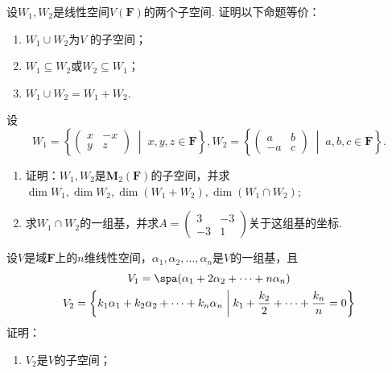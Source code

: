 \begin{exercise}
\begin{exgroup}
        \item 设$W_1,W_2$是线性空间$V(\mathbf{F})$的两个子空间. 证明以下命题等价：
        \begin{enumerate}
            \item $W_1 \cup W_2$为$V$ 的子空间；

            \item $W_1 \subseteq W_2$或$W_2 \subseteq W_1$；

            \item $W_1 \cup W_2=W_1+W_2$.
        \end{enumerate}

        \item 设\[W_1=\left\{\begin{pmatrix}
                x & -x \\ y & z
            \end{pmatrix} \;\middle|\; x,y,z\in \mathbf{F} \right\},W_2=\left\{\begin{pmatrix}
                a & b \\ -a & c
            \end{pmatrix} \;\middle|\; a,b,c\in \mathbf{F} \right\}.\]

        \begin{enumerate}
            \item 证明：$W_1,W_2$是$\mathbf{M}_2(\mathbf{F})$的子空间，并求$\dim W_1,\dim W_2,\dim(W_1+W_2),\dim(W_1\cap W_2)$;

            \item 求$W_1\cap W_2$的一组基，并求$A=\begin{pmatrix}
                          3 & -3 \\ -3 & 1
                      \end{pmatrix}$关于这组基的坐标.
        \end{enumerate}

        \item 设$V$是域$\mathbf{F}$上的$n$维线性空间，$\alpha_1,\alpha_2,\ldots,\alpha_n$是$V$的一组基，且
        \begin{gather*}
            V_1=\spa(\alpha_1+2\alpha_2+\cdots+n\alpha_n) \\
            V_2=\left\{k_1\alpha_1+k_2\alpha_2+\cdots+k_n\alpha_n \;\middle|\; k_1+\dfrac{k_2}{2}+\cdots+\dfrac{k_n}{n}=0\right\}
        \end{gather*}
        证明：
        \begin{enumerate}
            \item $V_2$是$V$的子空间；


\end{enumerate}
\end{exgroup}
\end{exercise}

